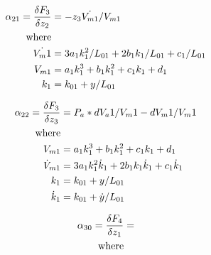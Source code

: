 \documentclass[11pt,a4paper]{article}
\begin{document}
\begin{appendices}
\begin{align}
    \alpha_{21} = \fdv{F_3}{z_2} &= -z_3\dot{V_{m1}}/V_{m1}
    \label{math:alpha_21_matrix}\\
    \text{where}\nonumber\\
    \dot{V_m1} &= 3a_1k_1^2/L_{01} + 2b_1k_1/L_{01} + c_1/L_{01}\nonumber\\
    V_{m1} &= a_1k_1^3 + b_1k_1^2 + c_1k_1 + d_1\nonumber\\
    k_1 &= k_{01} + y/L_{01}\nonumber
\end{align}

\begin{align}
    \alpha_{22} = \fdv{F_3}{z_3} &= P_a*dV_a1/V_m1 - dV_m1/V_m1
    \label{math:alpha_22_matrix}\\
    \text{where}\nonumber\\
    V_{m1} &= a_1k_1^3 + b_1k_1^2 + c_1k_1 + d_1\nonumber\\
    \dot{V}_{m1} &= 3a_1k_1^2\dot{k}_1 + 2b_1k_1\dot{k}_1 + c_1\dot{k}_1\nonumber\\
    k_1 &= k_{01} + y/L_{01}\nonumber\\
    \dot{k}_1 &= k_{01} + \dot{y}/L_{01}\nonumber\\
\end{align}

\begin{align}
    \alpha_{30} = \fdv{F_4}{z_1} &=
    \label{math:alpha_30_matrix}\\
    \text{where}\nonumber\\
\end{align}


\end{appendices}
\end{document}
